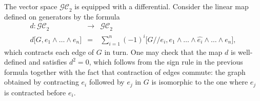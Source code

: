 \documentclass[12pt]{amsart}
\theoremstyle{plain}
\newcommand{\To}{\longrightarrow}
\newcommand{\GC}{\mathcal{GC}}
\newcommand{\q}{/\!\!/}
\newcommand{\0}{\color{blue}{\mathsf{0}}}
\begin{document}
The vector space $\GC_2$ is equipped with a differential. Consider the linear map defined on generators by the formula
\begin{eqnarray} 
d: \GC_2 & \To & \GC_2 \nonumber \\ 
d {[} G, e_1\wedge \ldots \wedge e_n] & = & \sum_{i=1}^n (-1)^i  {[} G\q e_i , e_1 \wedge \ldots \wedge \widehat{e_i} \wedge \ldots \wedge e_n{]} 
 ,   \nonumber
\end{eqnarray} 
which contracts each edge of $G$ in turn. One may check that the map $d$ is well-defined and satisfies $d^2=0$, which follows from the sign rule in the previous formula together with the fact that contraction of edges commute: the graph obtained by contracting $e_i$ followed by $e_j$ in $G$ is isomorphic to the one where $e_j$  is contracted before  $e_i$. 
\end{document}

